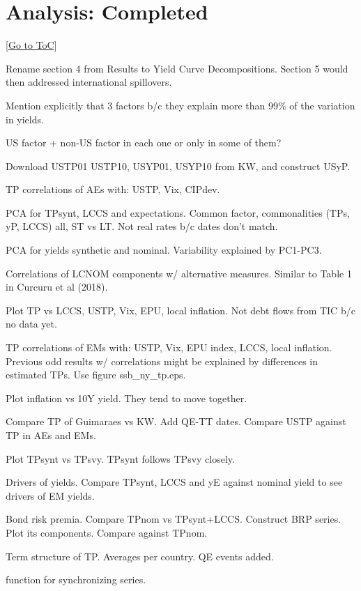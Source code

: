 \documentclass[12pt]{article}
\newcommand{\gototoc}{\vspace{-1.8cm} \null\hfill [\hyperlink{toc}{Go to ToC}] \newline}
\newcommand{\cmark}{\ding{51}}
\newcommand{\done}{\rlap{$\square$}{\raisebox{2pt}{\large\hspace{1pt}\cmark}}%
	\hspace{-2.5pt}}
\begin{document}
\section{Analysis: Completed}
\gototoc
\begin{todolist}
	\item[\done] Rename section 4 from Results to Yield Curve Decompositions. Section 5 would then addressed international spillovers.
	\item[\done] Mention explicitly that 3 factors b/c they explain more than 99\% of the variation in yields.
	\item[\done] US factor + non-US factor in each one or only in some of them?
	\item[\done] Download USTP01 USTP10, USYP01, USYP10 from KW, and construct USyP.
	\item[\done] TP correlations of AEs with: USTP, Vix, CIPdev.
	\item[\done] PCA for TPsynt, LCCS and expectations. Common factor, commonalities (TPs, yP, LCCS) all, ST vs LT. Not real rates b/c dates don't match.
	\item[\done] PCA for yields synthetic and nominal. Variability explained by PC1-PC3. 
	\item[\done] Correlations of LCNOM components w/ alternative measures. Similar to Table 1 in Curcuru et al (2018).
	\item[\done] Plot TP vs LCCS, USTP, Vix, EPU, local inflation. Not debt flows from TIC b/c no data yet.
	\item[\done] TP correlations of EMs with: USTP, Vix, EPU index, LCCS, local inflation. Previous odd results w/ correlations might be explained by differences in estimated TPs. Use figure ssb_ny_tp.eps.
	\item[\done] Plot inflation vs 10Y yield. They tend to move together.
	\item[\done] Compare TP of Guimaraes vs KW. Add QE-TT dates. Compare USTP against TP in AEs and EMs.
	\item[\done] Plot TPsynt vs TPsvy. TPsynt follows TPsvy closely.
	\item[\done] Drivers of yields. Compare TPsynt, LCCS and yE against nominal yield to see drivers of EM yields.
	\item[\done] Bond risk premia. Compare TPnom vs TPsynt+LCCS. Construct BRP series. Plot its components. Compare against TPnom.
	\item[\done] Term structure of TP. Averages per country. QE events added.
	\item[\done] function for synchronizing series.

\end{todolist}
\end{document}
